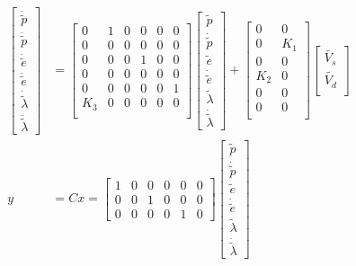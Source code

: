 \begin{align*}
\begin{bmatrix}
    \dot{\tilde{p}}\\
    \ddot{\tilde{p}}\\
    \dot{\tilde{e}}\\
    \ddot{\tilde{e}}\\
    \dot{\tilde{\lambda}}\\
    \ddot{\tilde{\lambda}}
\end{bmatrix} &= 
\begin{bmatrix}
    0 & 1 & 0 & 0 & 0 & 0\\
    0 & 0 & 0 & 0 & 0 & 0\\
    0 & 0 & 0 & 1 & 0 & 0\\
    0 & 0 & 0 & 0 & 0 & 0\\
    0 & 0 & 0 & 0 & 0 & 1\\
    K_3 & 0 & 0 & 0 & 0 & 0\\
\end{bmatrix}
\begin{bmatrix}
    \tilde{p}\\
    \dot{\tilde{p}}\\
    \tilde{e}\\
    \dot{\tilde{e}}\\
    \tilde{\lambda}\\
    \dot{\tilde{\lambda}}
\end{bmatrix} + 
\begin{bmatrix}
    0 & 0\\
    0 & K_1\\
    0 & 0\\
    K_2 & 0\\
    0 & 0\\
    0 & 0\\
\end{bmatrix}
\begin{bmatrix}
    \tilde{V_s}\\
    \tilde{V_d}\\
\end{bmatrix}
\\
y &= Cx = 
\begin{bmatrix}
    1 & 0 & 0 & 0 & 0 & 0\\
    0 & 0 & 1 & 0 & 0 & 0\\
    0 & 0 & 0 & 0 & 1 & 0
\end{bmatrix}
\begin{bmatrix}
    \tilde{p}\\
    \dot{\tilde{p}}\\
    \tilde{e}\\
    \dot{\tilde{e}}\\
    \tilde{\lambda}\\
    \dot{\tilde{\lambda}}
\end{bmatrix}
\end{align*}



